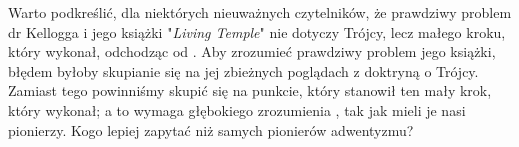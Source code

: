 Warto podkreślić, dla niektórych nieuważnych czytelników, że prawdziwy problem dr Kellogga i jego książki "\textit{Living Temple}" nie dotyczy Trójcy, lecz małego kroku, który wykonał, odchodząc od . Aby zrozumieć prawdziwy problem jego książki, błędem byłoby skupianie się na jej zbieżnych poglądach z doktryną o Trójcy. Zamiast tego powinniśmy skupić się na punkcie, który stanowił ten mały krok, który wykonał; a to wymaga głębokiego zrozumienia , tak jak mieli je nasi pionierzy. Kogo lepiej zapytać niż samych pionierów adwentyzmu?
